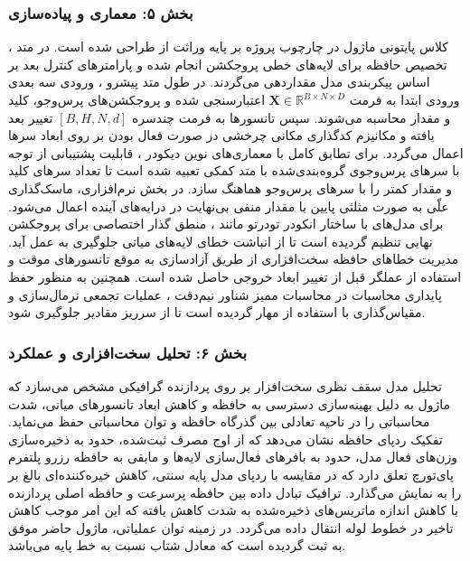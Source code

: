 \subsubsection*{بخش ۵: معماری و پیاده‌سازی }
کلاس پایتونی ماژول  در چارچوب پروژه بر پایه وراثت از  طراحی شده است. در متد ، تخصیص حافظه برای لایه‌های خطی پروجکشن انجام شده و پارامترهای کنترل بعد بر اساس پیکربندی مدل مقداردهی می‌گردند.
در طول متد پیشرو ، ورودی سه بعدی ورودی ابتدا به فرمت $\mathbf{X} \in \mathbb{R}^{B \times N \times D}$ اعتبارسنجی شده و پروجکشن‌های پرس‌وجو، کلید و مقدار محاسبه می‌شوند. سپس تانسورها به فرمت چندسره $[B, H, N, d]$ تغییر بعد یافته و مکانیزم کدگذاری مکانی چرخشی  در صورت فعال بودن بر روی ابعاد سرها اعمال می‌گردد.
برای تطابق کامل با معماری‌های نوین دیکودر ، قابلیت پشتیبانی از توجه با سرهای پرس‌وجوی گروه‌بندی‌شده  با متد کمکی  تعبیه شده است تا تعداد سرهای کلید و مقدار کمتر را با سرهای پرس‌وجو هماهنگ سازد.
در بخش نرم‌افزاری، ماسک‌گذاری علّی  به صورت مثلثی پایین با مقدار منفی بی‌نهایت در درایه‌های آینده اعمال می‌شود. برای مدل‌های با ساختار انکودر تودرتو  مانند ، منطق گذار اختصاصی برای پروجکشن نهایی تنظیم گردیده است تا از انباشت خطای لایه‌های میانی جلوگیری به عمل آید.
مدیریت خطاهای حافظه سخت‌افزاری  از طریق آزادسازی به موقع تانسورهای موقت و استفاده از عملگر  قبل از تغییر ابعاد خروجی حاصل شده است.
همچنین به منظور حفظ پایداری محاسبات در محاسبات ممیز شناور نیم‌دقت ، عملیات تجمعی نرمال‌سازی و مقیاس‌گذاری با استفاده از  مهار گردیده است تا از سرریز مقادیر جلوگیری شود.

\subsubsection*{بخش ۶: تحلیل سخت‌افزاری و عملکرد }
تحلیل مدل سقف نظری سخت‌افزار  بر روی پردازنده گرافیکی  مشخص می‌سازد که ماژول  به دلیل بهینه‌سازی دسترسی به حافظه و کاهش ابعاد تانسورهای میانی، شدت محاسباتی  را در ناحیه تعادلی بین گذرگاه حافظه و توان محاسباتی حفظ می‌نماید.
تفکیک ردپای حافظه نشان می‌دهد که از اوج مصرف  ثبت‌شده، حدود  به ذخیره‌سازی وزن‌های فعال مدل، حدود  به بافرهای فعال‌سازی لایه‌ها و مابقی به حافظه رزرو پلتفرم پای‌تورچ تعلق دارد که در مقایسه با ردپای  مدل پایه سنتی، کاهش خیره‌کننده‌ای بالغ بر  را به نمایش می‌گذارد.
ترافیک تبادل داده بین حافظه پرسرعت  و حافظه اصلی  پردازنده با کاهش اندازه ماتریس‌های ذخیره‌شده به شدت کاهش یافته که این امر موجب کاهش تاخیر در خطوط لوله انتقال داده  می‌گردد.
در زمینه توان عملیاتی، ماژول حاضر موفق به ثبت  گردیده است که معادل شتاب  نسبت به خط پایه می‌باشد.

